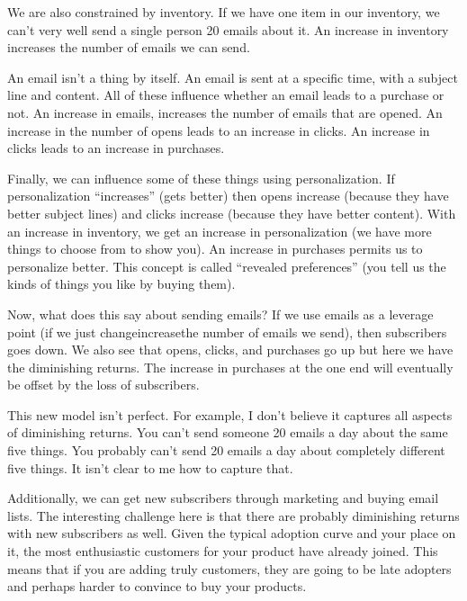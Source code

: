 \documentclass[letterpaper,10pt,english]{sphinxmanual}
\begin{document}
We are also constrained by inventory. If we have one item in our inventory, we can’t very well send a single person 20 emails about it. An increase in inventory increases the number of emails we can send.

An email isn’t a thing by itself. An email is sent at a specific time, with a subject line and content. All of these influence whether an email leads to a purchase or not. An increase in emails, increases the number of emails that are opened. An increase in the number of opens leads to an increase in clicks. An increase in clicks leads to an increase in purchases.

Finally, we can influence some of these things using personalization. If personalization “increases” (gets better) then opens increase (because they have better subject lines) and clicks increase (because they have better content). With an increase in inventory, we get an increase in personalization (we have more things to choose from to show you). An increase in purchases permits us to personalize better. This concept is called “revealed preferences” (you tell us the kinds of things you like by
buying them).


\begin{DUlineblock}{0em}
\item[] 
\end{DUlineblock}

Now, what does this say about sending emails? If we use emails as a leverage point (if we just change\textendash{}increase\textendash{}the number of emails we send), then subscribers goes down. We also see that opens, clicks, and purchases go up but here we have the diminishing returns. The increase in purchases at the one end will eventually be offset by the loss of subscribers.

This new model isn’t perfect. For example, I don’t believe it captures all aspects of diminishing returns. You can’t send someone 20 emails a day about the same five things. You probably can’t send 20 emails a day about completely different five things. It isn’t clear to me how to capture that.

Additionally, we can get new subscribers through marketing and buying email lists. The interesting challenge here is that there are probably diminishing returns with new subscribers as well. Given the typical adoption curve and your place on it, the most enthusiastic customers for your product have already joined. This means that if you are adding truly  customers, they are going to be late adopters and perhaps harder to convince to buy your products.
\end{document}
